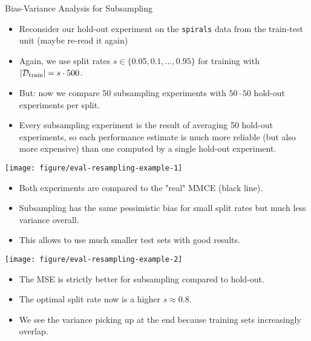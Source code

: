 \begin{vbframe}{Bias-Variance Analysis for Subsampling}

  \begin{itemize}
    \item Reconsider our hold-out experiment on the \texttt{spirals} data from 
    the train-test unit (maybe re-read it again)
    \item Again, we use split rates $s \in \{0.05, 0.1, ..., 0.95\}$ for 
    training with $|\mathcal{D}_{\text{train}}| = s \cdot 500$.
    \item But: now we compare 50 subsampling experiments with $50 \cdot 50$ 
    hold-out experiments per split.
    \item Every subsampling experiment is the result of averaging 50 hold-out 
    experiments, so each performance estimate is much more reliable (but also 
    more expensive) than one computed by a single hold-out experiment.
  \end{itemize}

\framebreak

\begin{center}
\texttt{[image: figure/eval-resampling-example-1]}
\end{center}



\begin{itemize}
  \item Both experiments are compared to the "real" MMCE (black line).
  \item Subsampling has the same pessimistic bias for small split rates but 
  much less variance overall.
  \item This allows to use much smaller test sets with good results.
\end{itemize}

\framebreak

\begin{center}
\texttt{[image: figure/eval-resampling-example-2]}
\end{center}

\begin{itemize}
  \item The MSE is strictly better for subsampling compared to hold-out.
  \item The optimal split rate now is a higher $s \approx 0.8$.
  \item We see the variance picking up at the end because training sets 
  increasingly overlap.
\end{itemize}

\end{vbframe}

